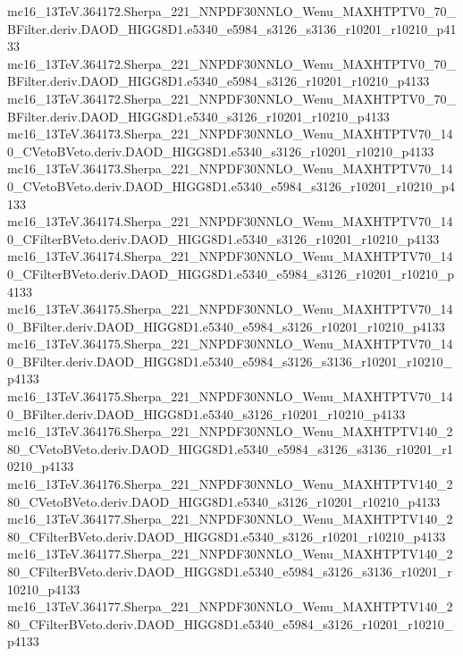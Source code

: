 \begin{footnotesize}
mc16\_13TeV.364172.Sherpa\_221\_NNPDF30NNLO\_Wenu\_MAXHTPTV0\_70\_BFilter.deriv.DAOD\_HIGG8D1.e5340\_e5984\_s3126\_s3136\_r10201\_r10210\_p4133 \\
mc16\_13TeV.364172.Sherpa\_221\_NNPDF30NNLO\_Wenu\_MAXHTPTV0\_70\_BFilter.deriv.DAOD\_HIGG8D1.e5340\_e5984\_s3126\_r10201\_r10210\_p4133 \\
mc16\_13TeV.364172.Sherpa\_221\_NNPDF30NNLO\_Wenu\_MAXHTPTV0\_70\_BFilter.deriv.DAOD\_HIGG8D1.e5340\_s3126\_r10201\_r10210\_p4133 \\
mc16\_13TeV.364173.Sherpa\_221\_NNPDF30NNLO\_Wenu\_MAXHTPTV70\_140\_CVetoBVeto.deriv.DAOD\_HIGG8D1.e5340\_s3126\_r10201\_r10210\_p4133 \\
mc16\_13TeV.364173.Sherpa\_221\_NNPDF30NNLO\_Wenu\_MAXHTPTV70\_140\_CVetoBVeto.deriv.DAOD\_HIGG8D1.e5340\_e5984\_s3126\_r10201\_r10210\_p4133 \\
mc16\_13TeV.364174.Sherpa\_221\_NNPDF30NNLO\_Wenu\_MAXHTPTV70\_140\_CFilterBVeto.deriv.DAOD\_HIGG8D1.e5340\_s3126\_r10201\_r10210\_p4133 \\
mc16\_13TeV.364174.Sherpa\_221\_NNPDF30NNLO\_Wenu\_MAXHTPTV70\_140\_CFilterBVeto.deriv.DAOD\_HIGG8D1.e5340\_e5984\_s3126\_r10201\_r10210\_p4133 \\
mc16\_13TeV.364175.Sherpa\_221\_NNPDF30NNLO\_Wenu\_MAXHTPTV70\_140\_BFilter.deriv.DAOD\_HIGG8D1.e5340\_e5984\_s3126\_r10201\_r10210\_p4133 \\
mc16\_13TeV.364175.Sherpa\_221\_NNPDF30NNLO\_Wenu\_MAXHTPTV70\_140\_BFilter.deriv.DAOD\_HIGG8D1.e5340\_e5984\_s3126\_s3136\_r10201\_r10210\_p4133 \\
mc16\_13TeV.364175.Sherpa\_221\_NNPDF30NNLO\_Wenu\_MAXHTPTV70\_140\_BFilter.deriv.DAOD\_HIGG8D1.e5340\_s3126\_r10201\_r10210\_p4133 \\
mc16\_13TeV.364176.Sherpa\_221\_NNPDF30NNLO\_Wenu\_MAXHTPTV140\_280\_CVetoBVeto.deriv.DAOD\_HIGG8D1.e5340\_e5984\_s3126\_s3136\_r10201\_r10210\_p4133 \\
mc16\_13TeV.364176.Sherpa\_221\_NNPDF30NNLO\_Wenu\_MAXHTPTV140\_280\_CVetoBVeto.deriv.DAOD\_HIGG8D1.e5340\_s3126\_r10201\_r10210\_p4133 \\
mc16\_13TeV.364177.Sherpa\_221\_NNPDF30NNLO\_Wenu\_MAXHTPTV140\_280\_CFilterBVeto.deriv.DAOD\_HIGG8D1.e5340\_s3126\_r10201\_r10210\_p4133 \\
mc16\_13TeV.364177.Sherpa\_221\_NNPDF30NNLO\_Wenu\_MAXHTPTV140\_280\_CFilterBVeto.deriv.DAOD\_HIGG8D1.e5340\_e5984\_s3126\_s3136\_r10201\_r10210\_p4133 \\
mc16\_13TeV.364177.Sherpa\_221\_NNPDF30NNLO\_Wenu\_MAXHTPTV140\_280\_CFilterBVeto.deriv.DAOD\_HIGG8D1.e5340\_e5984\_s3126\_r10201\_r10210\_p4133 \\

\end{footnotesize}
